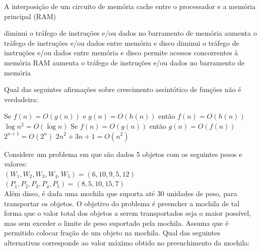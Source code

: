 \documentclass[12pt, addpoints]{exam}
\begin{document}
    \begin{questions}

    \newpage
    \question

A interposição de um circuito de memória cache entre o processador e a memória principal (RAM)
\begin{choices}
\choice diminui o tráfego de instruções e/ou dados no barramento de memória
\choice aumenta o tráfego de instruções e/ou dados entre memória e disco
\choice diminui o tráfego de instruções e/ou dados entre memória e disco
\choice permite acessos concorrentes à memória RAM
\choice aumenta o tráfego de instruções e/ou dados no barramento de memória
\end{choices}

\question

Qual das seguintes afirmações sobre crescimento assintótico de funções não é verdadeira:
\begin{choices}
\choice Se \( f(n) = O(g(n)) \) e \( g(n) = O(h(n)) \) então \( f(n) = O(h(n)) \)
\choice \( \log n^2 = O(\log n) \)
\choice Se \( f(n) = O(g(n)) \) então \( g(n) = O(f(n)) \)
\choice \( 2^{n+1} = O(2^n) \)
\choice \( 2n^2 + 3n + 1 = O(n^2) \)
\end{choices}

\question

Considere um problema em que são dados 5 objetos com os seguintes pesos e valores:\\

 $(W_1, W_2, W_3, W_4, W_5) = (6, 10, 9, 5, 12)$\\

 $(P_1, P_2, P_3, P_4, P_5) = (8, 5, 10, 15, 7)$\\

Além disso, é dada uma mochila que suporta até 30 unidades de peso, para transportar os objetos. O objetivo do problema é preencher a mochila de tal forma que o valor total dos objetos a serem transportados seja o maior possível, mas sem exceder o limite de peso suportado pela mochila. Assuma que é permitido colocar fração de um objeto na mochila. Qual das seguintes alternativas corresponde ao valor máximo obtido no preenchimento da mochila:
\begin{choices}
\end{choices}

\question


\end{questions}
\end{document}
